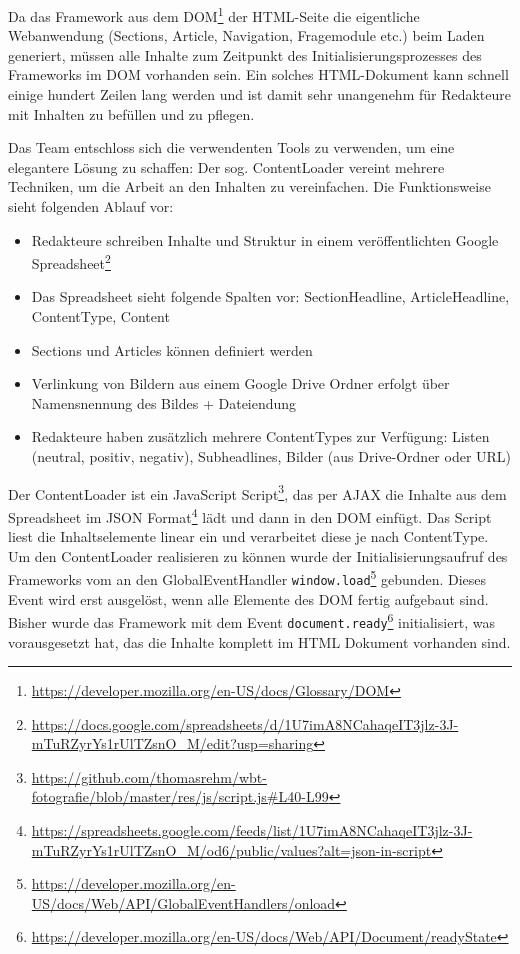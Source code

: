 \documentclass{article}
\begin{document}
Da das Framework aus dem DOM\footnote{\url{https://developer.mozilla.org/en-US/docs/Glossary/DOM}} der HTML-Seite die eigentliche Webanwendung (Sections, Article, Navigation, Fragemodule etc.) beim Laden generiert, m\"ussen alle Inhalte zum Zeitpunkt des Initialisierungsprozesses des Frameworks im DOM vorhanden sein. Ein solches HTML-Dokument kann schnell einige hundert Zeilen lang werden und ist damit sehr unangenehm f\"ur Redakteure mit Inhalten zu bef\"ullen und zu pflegen. 

Das Team entschloss sich die verwendenten Tools zu verwenden, um eine elegantere L\"osung zu schaffen: Der sog. ContentLoader vereint mehrere Techniken, um die Arbeit an den Inhalten zu vereinfachen. Die Funktionsweise sieht folgenden Ablauf vor:

\begin{itemize}
\item Redakteure schreiben Inhalte und Struktur in einem ver\"offentlichten Google Spreadsheet\footnote{\url{https://docs.google.com/spreadsheets/d/1U7imA8NCahaqeIT3jlz-3J-mTuRZyrYs1rUlTZsnO_M/edit?usp=sharing}}
\item Das Spreadsheet sieht folgende Spalten vor:
SectionHeadline, ArticleHeadline, ContentType, Content
\item Sections und Articles k\"onnen definiert werden
\item Verlinkung von Bildern aus einem Google Drive Ordner erfolgt \"uber Namensnennung des Bildes + Dateiendung
\item Redakteure haben zus\"atzlich mehrere ContentTypes zur Verf\"ugung: Listen (neutral, positiv, negativ), Subheadlines, Bilder (aus Drive-Ordner oder URL)

\end{itemize}

Der ContentLoader ist ein JavaScript Script\footnote{\url{https://github.com/thomasrehm/wbt-fotografie/blob/master/res/js/script.js\#L40-L99}}, das per AJAX die Inhalte aus dem Spreadsheet im JSON Format\footnote{\url{https://spreadsheets.google.com/feeds/list/1U7imA8NCahaqeIT3jlz-3J-mTuRZyrYs1rUlTZsnO_M/od6/public/values?alt=json-in-script}} l\"adt und dann in den DOM einf\"ugt. Das Script liest die Inhaltselemente linear ein und verarbeitet diese je nach ContentType.
Um den ContentLoader realisieren zu k\"onnen wurde der Initialisierungsaufruf des Frameworks vom an den GlobalEventHandler \texttt{window.load}\footnote{\url{https://developer.mozilla.org/en-US/docs/Web/API/GlobalEventHandlers/onload}} gebunden. Dieses Event wird erst ausgel\"ost, wenn alle Elemente des DOM fertig aufgebaut sind. Bisher wurde das Framework mit dem Event \texttt{document.ready}\footnote{\url{https://developer.mozilla.org/en-US/docs/Web/API/Document/readyState}} initialisiert, was vorausgesetzt hat, das die Inhalte komplett im HTML Dokument vorhanden sind.
\end{document}
